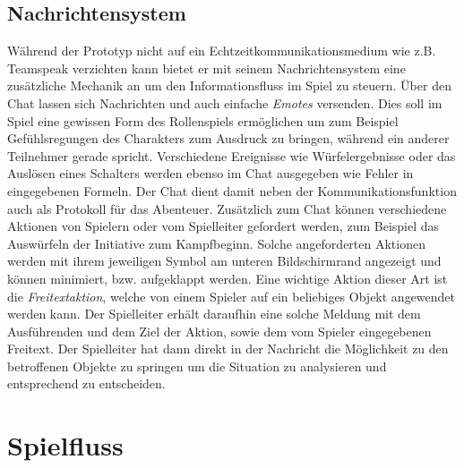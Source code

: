\subsection{Nachrichtensystem}
\label{sec:Nachrichtensystem}
Während der Prototyp nicht auf ein Echtzeitkommunikationsmedium wie z.B. Teamspeak verzichten kann bietet er mit seinem Nachrichtensystem eine zusätzliche Mechanik an um den Informationsfluss im Spiel zu steuern. 
Über den Chat lassen sich Nachrichten und auch einfache \emph{Emotes} versenden. Dies soll im Spiel eine gewissen Form des Rollenspiels ermöglichen um zum Beispiel Gefühlsregungen des Charakters zum Ausdruck zu bringen, während ein anderer Teilnehmer gerade spricht. Verschiedene Ereignisse wie Würfelergebnisse oder das Auslösen eines Schalters werden ebenso im Chat ausgegeben wie Fehler in eingegebenen Formeln. Der Chat dient damit neben der Kommunikationsfunktion auch als Protokoll für das Abenteuer.\newline
Zusätzlich zum Chat können verschiedene Aktionen von Spielern oder vom Spielleiter gefordert werden, zum Beispiel das Auswürfeln der Initiative zum Kampfbeginn. Solche angeforderten Aktionen werden mit ihrem jeweiligen Symbol am unteren Bildschirmrand angezeigt und können minimiert, bzw. aufgeklappt werden.\newline
Eine wichtige Aktion dieser Art ist die \emph{Freitextaktion}, welche von einem Spieler auf ein beliebiges Objekt angewendet werden kann. Der Spielleiter erhält daraufhin eine solche Meldung mit dem Ausführenden und dem Ziel der Aktion, sowie dem vom Spieler eingegebenen Freitext. Der Spielleiter hat dann direkt in der Nachricht die Möglichkeit zu den betroffenen Objekte zu springen um die Situation zu analysieren und entsprechend zu entscheiden.


\section{Spielfluss}
\label{sec:Spielfluss}

